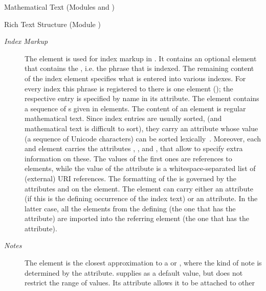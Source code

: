 \begin{tchapter}[id=mtxt,short=Mathematical Text]{Mathematical Text (Modules
  {} and {})}
\begin{tsection}[id=rt,short=Rich Text Structure]{Rich Text Structure (Module {})}
\begin{description}
\item[\emph{Index Markup}] The {} element is used for index
  markup in {\omdoc}. It contains an optional {} element that contains the
  {}, i.e. the phrase that is indexed. The remaining content of the
  index element specifies what is entered into various indexes. For every index this
  phrase is registered to there is one {} element ({});
  the respective entry is specified by name in its 
  {} attribute. The {} element contains a sequence of
  {s} given in {} elements. The content of an
  {} element is regular mathematical text. Since index entries are usually
  sorted, (and mathematical text is difficult to sort), they carry an attribute
  {} whose value (a sequence of Unicode characters) can be sorted
  lexically~\cite{Unicode:collation}. Moreover, each {} and {}
  element carries the attributes {},
  {}, and {}, that allow to specify
  extra information on these. The values of the first ones are references to
  {} elements, while the value of the {} attribute is a
  whitespace-separated list of (external) URI references.  The formatting of the
  {} is governed by the attributes {} and
  {} on the {} element. The {} element can
  carry either an {} attribute (if this is the defining
  occurrence of the index text) or an {} attribute. In the latter
  case, all the {} elements from the defining {} (the one that
  has the {} attribute) are imported into the referring
  {} element (the one that has the {} attribute).
\item[\emph{Notes}] The {} element is the closest approximation to
  a {} or {}, where the kind of note is determined by
  the {} attribute. {\omdoc} supplies
  {} as a default value, but does not restrict the range of
  values. Its {} attribute allows it to be attached to other {\omdoc}

\end{description}
\end{tsection}
\end{tchapter}
